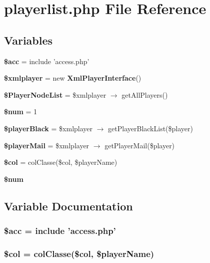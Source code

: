 \section{playerlist.php File Reference}
\label{playerlist_8php}


\subsection*{Variables}
\begin{CompactItemize}
\item 
{\bf \$acc} = include 'access.php'
\item 
{\bf \$xmlplayer} = new {\bf Xml\-Player\-Interface}()
\item 
{\bf \$Player\-Node\-List} = \$xmlplayer $\rightarrow$ get\-All\-Players()
\item 
{\bf \$num} = 1
\item 
{\bf \$player\-Black} = \$xmlplayer $\rightarrow$ get\-Player\-Black\-List(\$player)
\item 
{\bf \$player\-Mail} = \$xmlplayer $\rightarrow$ get\-Player\-Mail(\$player)
\item 
{\bf \$col} = col\-Classe(\$col, \$player\-Name)
\item 
{\bf \$num}
\end{CompactItemize}


\subsection{Variable Documentation}
\subsubsection{\setlength{\rightskip}{0pt plus 5cm}\$acc = include 'access.php'}\label{playerlist_8php_542926c588a05eb69553d79c83cf73da}


\subsubsection{\setlength{\rightskip}{0pt plus 5cm}\$col = col\-Classe(\$col, \$player\-Name)}\label{playerlist_8php_fca5b7d4c9144178253e99d0ada7d519}


